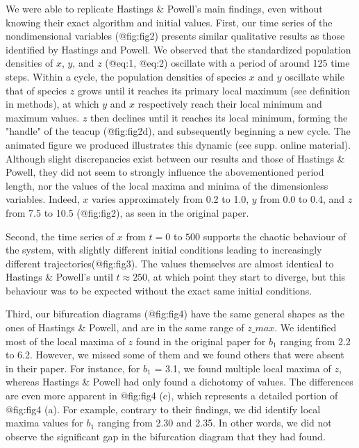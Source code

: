 We were able to replicate Hastings & Powell's main findings, even without knowing their
exact algorithm and initial values.
First, our time series of the nondimensional variables (@fig:fig2) presents similar
qualitative results as those identified by Hastings and Powell.
We observed that the standardized population densities of $x$, $y$, and $z$ (@eq:1, @eq:2)
oscillate with a period of around 125 time steps.
Within a cycle, the population densities of species $x$ and $y$ oscillate while that of
species $z$ grows until it reaches its primary local maximum (see definition in methods),
at which $y$ and $x$ respectively reach their local minimum and maximum values.
$z$ then declines until it reaches its local minimum, forming the "handle" of the teacup
(@fig:fig2d), and subsequently beginning a new cycle.
The animated figure we produced illustrates this dynamic (see supp.
online material).
Although slight discrepancies exist between our results and those of Hastings & Powell,
they did not seem to strongly influence the abovementioned period length, nor the values
of the local maxima and minima of the dimensionless variables.
Indeed, $x$ varies approximately from 0.2 to 1.0, $y$ from 0.0 to 0.4, and $z$ from 7.5 to
10.5 (@fig:fig2), as seen in the original paper.

Second, the time series of $x$ from $t = 0$ to $500$ supports the chaotic behaviour of the
system, with slightly different initial conditions leading to increasingly different
trajectories(@fig:fig3). The values themselves are almost identical to Hastings & Powell's
until $t \approx 250$, at which point they start to diverge, but this behaviour was to be
expected without the exact same initial conditions.

Third, our bifurcation diagrams (@fig:fig4) have the same general shapes as the ones of
Hastings & Powell, and are in the same range of $z\_{max}$. We identified most of the
local maxima of $z$ found in the original paper for $b_1$ ranging from 2.2 to 6.2.
However, we missed some of them and we found others that were absent in their paper.
For instance, for $b_1$ = 3.1, we found multiple local maxima of $z$, whereas Hastings &
Powell had only found a dichotomy of values.
The differences are even more apparent in @fig:fig4 (c), which represents a detailed
portion of @fig:fig4 (a). For example, contrary to their findings, we did identify local
maxima values for $b_1$ ranging from 2.30 and 2.35. In other words, we did not observe the
significant gap in the bifurcation diagram that they had found.

